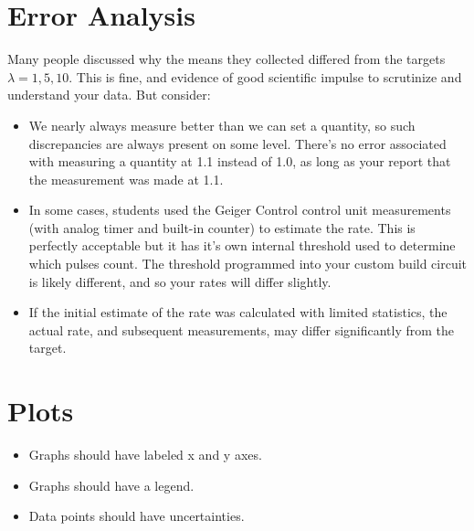 \documentclass[12pt]{article}
\begin{document}
\section{Error Analysis}
Many people discussed why the means they collected differed from the targets $\lambda = 1,5,10$.  This is fine, and evidence of good scientific impulse to scrutinize and understand your data.  But consider:
\begin{itemize}
\item We nearly always measure better than we can set a quantity, so such discrepancies are always present on some level.  There's no error associated with measuring a quantity at 1.1 instead of 1.0, as long as your report that the measurement was made at 1.1.
\item In some cases, students used the Geiger Control control unit measurements (with analog timer and built-in counter) to estimate the rate.  This is perfectly acceptable but it has it's own internal threshold used to determine which pulses count.  The threshold programmed into your custom build circuit is likely different, and so your rates will differ slightly.
\item If the initial estimate of the rate was calculated with limited statistics, the actual rate, and subsequent measurements, may differ significantly from the target.
\end{itemize}

\section{Plots}
\begin{itemize}
\item Graphs should have labeled x and y axes.
\item Graphs should have a legend.
\item Data points should have uncertainties.
\end{itemize}
\end{document}
